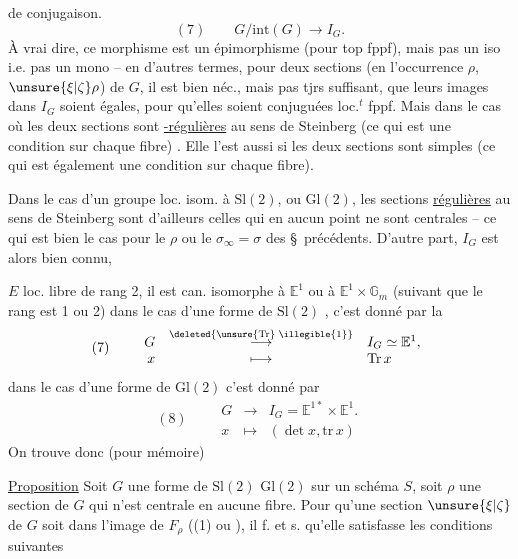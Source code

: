 de conjugaison.
\[
(7)\qquad G/\mathrm{int}(G)\longrightarrow I_G.
\]
À vrai dire,  ce morphisme est un épimorphisme (pour  top fppf), mais pas un iso i.e. pas un mono -- en d'autres termes, pour deux sections (en l'occurrence $\rho$, $\unsure{\xi|\zeta}\rho$) de $G$, il est bien néc., mais pas tjrs suffisant, que leurs images dans $I_G$ soient égales, pour qu'elles soient conjuguées loc.$^{t}$ fppf. Mais dans le cas où les deux sections sont \uline{-régulières} au sens de Steinberg (ce qui est une condition sur chaque fibre)  . Elle l'est aussi si les deux sections sont  simples (ce qui est également une condition sur chaque fibre).

Dans le cas d'un groupe loc. isom. à $\mathrm{Sl}(2)$,  ou $\mathrm{Gl}(2)$, les sections \uline{régulières} au sens de Steinberg sont d'ailleurs celles qui en aucun point ne sont centrales -- ce qui est bien le cas pour le $\rho$ ou le $\sigma_\infty=\sigma$ des \S\ précédents. D'autre part, $I_G$ est alors bien connu, 

$E$ loc. libre de rang 2, il est can. isomorphe à $\mathbb E^1$ ou à $\mathbb E^1\times\mathbb G_m$ (suivant que le rang est 1 ou 2) dans le cas d'une forme de $\mathrm{Sl}(2)$ , c'est donné par la \uline{}
\[
(7)\qquad
\begin{array}{rcl}
G&\overset{\deleted{\unsure{\mathrm{Tr}}\;\illegible{1}}}{\longrightarrow}&I_G\simeq\mathbb E^1,\\
x&\longmapsto&\mathrm{Tr}\,x
\end{array}
\]
dans le cas d'une forme de $\mathrm{Gl}(2)$ c'est donné par
\[
(8)\qquad
\begin{array}{rcl}
G&\longrightarrow&I_G=\mathbb E^{1*}\times\mathbb E^1.\\
x&\longmapsto&(\det x,\mathrm{tr}\,x)
\end{array}
\]
On trouve donc (pour mémoire)

\uline{Proposition} Soit $G$ une forme de $\mathrm{Sl}(2)$  $\mathrm{Gl}(2)$ sur un schéma $S$, soit $\rho$ une section de $G$ qui n'est centrale en aucune fibre. Pour qu'une section $\unsure{\xi|\zeta}$ de $G$ soit  dans l'image de $F_\rho$ ((1) ou ), il f. et s. qu'elle satisfasse les conditions suivantes

